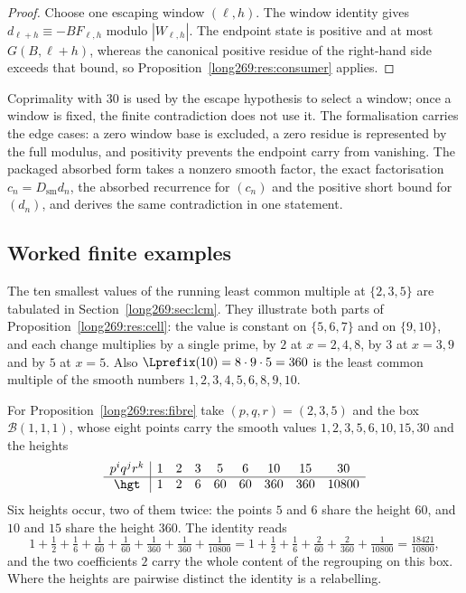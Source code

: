 \begin{proof}
Choose one escaping window $(\ell,h)$.  The window identity gives
$d_{\ell+h}\equiv-BF_{\ell,h}$ modulo $|W_{\ell,h}|$.  The endpoint state is
positive and at most $G(B,\ell+h)$, whereas the canonical positive residue of
the right-hand side exceeds that bound, so Proposition~\ref{long269:res:consumer}
applies.
\end{proof}

Coprimality with $30$ is used by the escape hypothesis to select a window; once
a window is fixed, the finite contradiction does not use it.  The formalisation
carries the edge cases: a zero window base is excluded, a zero residue is
represented by the full modulus, and positivity prevents the endpoint carry
from vanishing.  The packaged absorbed form takes a nonzero smooth factor, the
exact factorisation $c_n=D_{\mathrm{sm}}d_n$, the absorbed recurrence for
$(c_n)$ and the positive short bound for $(d_n)$, and derives the same
contradiction in one statement.

\subsection{Worked finite examples}\label{long269:long:finite-geometry}

The ten smallest values of the running least common multiple at $\{2,3,5\}$ are
tabulated in Section~\ref{long269:sec:lcm}.  They illustrate both parts of
Proposition~\ref{long269:res:cell}: the value is constant on $\{5,6,7\}$ and on
$\{9,10\}$, and each change multiplies by a single prime, by $2$ at
$x=2,4,8$, by $3$ at $x=3,9$ and by $5$ at $x=5$.  Also $\Lprefix(10)=8\cdot9\cdot5=360$
is the least common multiple of the smooth numbers $1,2,3,4,5,6,8,9,10$.

For Proposition~\ref{long269:res:fibre} take $(p,q,r)=(2,3,5)$ and the box
$\mathcal B(1,1,1)$, whose eight points carry the smooth values
$1,2,3,5,6,10,15,30$ and the heights
\[
\begin{array}{c|cccccccc}
p^{i}q^{j}r^{k}&1&2&3&5&6&10&15&30\\ \hline
\hgt&1&2&6&60&60&360&360&10800
\end{array}
\]
Six heights occur, two of them twice: the points $5$ and $6$ share the height
$60$, and $10$ and $15$ share the height $360$.  The identity reads
\[
 1+\tfrac12+\tfrac16+\tfrac1{60}+\tfrac1{60}+\tfrac1{360}+\tfrac1{360}
 +\tfrac1{10800}
 =1+\tfrac12+\tfrac16+\tfrac2{60}+\tfrac2{360}+\tfrac1{10800}
 =\tfrac{18421}{10800},
\]
and the two coefficients $2$ carry the whole content of the regrouping on this
box.  Where the heights are pairwise distinct the identity is a relabelling.

